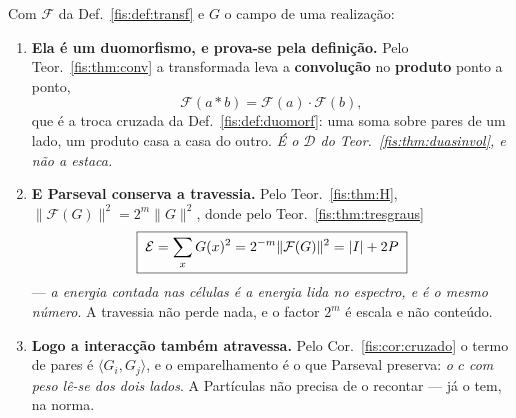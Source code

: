 \documentclass[livro.tex]{subfiles}
\begin{document}
\begin{teorema}\label{fis:thm:ponte}
Com $\mathcal{F}$ da Def.~\ref{fis:def:transf} e $G$ o campo de uma realização:
\begin{enumerate}\itemsep3pt
\item[(1)] \textbf{Ela é um duomorfismo, e prova-se pela definição.} Pelo
Teor.~\ref{fis:thm:conv} a transformada leva a \textbf{convolução} no
\textbf{produto} ponto a ponto,
\[
\mathcal{F}(a\ast b)=\mathcal{F}(a)\cdot\mathcal{F}(b) ,
\]
que é a troca cruzada da Def.~\ref{fis:def:duomorf}: uma soma sobre pares de um
lado, um produto casa a casa do outro. \emph{É o $\mathcal{D}$ do
Teor.~\ref{fis:thm:duasinvol}, e não a estaca.}
\item[(2)] \textbf{E Parseval conserva a travessia.} Pelo Teor.~\ref{fis:thm:H},
$\lVert\mathcal{F}(G)\rVert^{2}=2^{m}\lVert G\rVert^{2}$, donde pelo
Teor.~\ref{fis:thm:tresgraus}
\[
\boxed{\;\mathcal{E}=\sum_x G(x)^{2}=2^{-m}\lVert\mathcal{F}(G)\rVert^{2}=\lvert I\rvert+2P\;}
\]
--- \emph{a energia contada nas células é a energia lida no espectro, e é o mesmo
número}. A travessia não perde nada, e o factor $2^{m}$ é escala e não conteúdo.
\item[(3)] \textbf{Logo a interacção também atravessa.} Pelo
Cor.~\ref{fis:cor:cruzado} o termo de pares é $\langle G_i,G_j\rangle$, e o
emparelhamento é o que Parseval preserva: \emph{o $c$ com peso lê-se dos dois
lados}. A Partículas não precisa de o recontar --- já o tem, na norma.
\end{enumerate}
\end{teorema}
\end{document}
